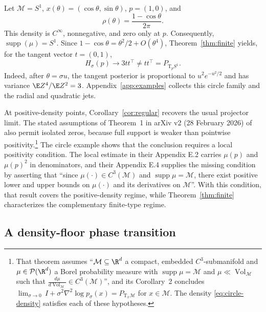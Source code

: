 \documentclass[10pt]{article}
\theoremstyle{c2fup}
\newcommand{\M}{\mathcal{M}}
\newcommand{\T}{\mathrm{T}}
\begin{document}
Let $\M=S^1$, $x(\theta)=(\cos\theta,\sin\theta)$, $p=(1,0)$, and
\begin{equation}
  \rho(\theta)=\frac{1-\cos\theta}{2\pi}.
  \label{eq:circle-density}
\end{equation}
This density is $C^\infty$, nonnegative, and zero only at $p$.  Consequently, $\operatorname{supp}(\mu)=S^1$.  Since $1-\cos\theta=\theta^2/2+O(\theta^4)$, Theorem~\ref{thm:finite} yields, for the tangent vector $t=(0,1)$,
\begin{equation}
  H_\sigma(p)\longrightarrow 3tt^\top\ne tt^\top=P_{\T_pS^1}.
  \label{eq:circle-counter}
\end{equation}
Indeed, after $\theta=\sigma u$, the tangent posterior is proportional to $u^2e^{-u^2/2}$ and has variance $\E Z^4/\E Z^2=3$.  Appendix~\ref{app:examples} collects this circle family and the radial and quadratic jets.

At positive-density points, Corollary~\ref{cor:regular} recovers the usual projector limit.  The stated assumptions of Theorem~1 in arXiv v2 (28 February 2026) of \citet{kharitenko2026landing} also permit isolated zeros, because full support is weaker than pointwise positivity.\footnote{That theorem assumes ``$\M\subseteq\R^d$ a compact, embedded $C^3$-submanifold and $\mu\in\mathcal P(\R^d)$ a Borel probability measure with $\operatorname{supp}\mu=\M$ and $\mu\ll\operatorname{Vol}_\M$ such that $\tfrac{d\mu}{d\operatorname{Vol}_\M}\in C^3(\M)$'', and its Corollary~2 concludes $\lim_{\sigma\to0}\,I+\sigma^2\nabla^2\log p_\sigma(x)=P_{\T_x\M}$ for $x\in\M$.  The density \eqref{eq:circle-density} satisfies each of these hypotheses.}  The circle example shows that the conclusion requires a local positivity condition.  The local estimate in their Appendix E.2 carries $\mu(p)$ and $\mu(p)^2$ in denominators, and their Appendix E.4 supplies the missing condition by asserting that ``since $\mu(\cdot)\in C^3(\M)$ and $\operatorname{supp}\mu=\M$, there exist positive lower and upper bounds on $\mu(\cdot)$ and its derivatives on $\M$''.  With this condition, that result covers the positive-density regime, while Theorem~\ref{thm:finite} characterizes the complementary finite-type regime.

\subsection{A density-floor phase transition}
\label{sec:crossover}
\end{document}
